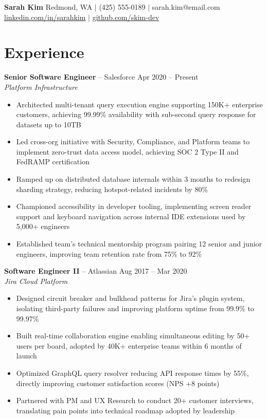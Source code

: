 \documentclass[10pt,letterpaper]{article}
\begin{document}
{\large\bfseries Sarah Kim} \hfill {\footnotesize Redmond, WA $\mid$ (425) 555-0189 $\mid$ sarah.kim@email.com}\\
{\footnotesize \href{https://linkedin.com/in/sarahkim}{linkedin.com/in/sarahkim} $\mid$ \href{https://github.com/skim-dev}{github.com/skim-dev}}

\section{Experience}

{\bfseries Senior Software Engineer} -- Salesforce \hfill {\footnotesize\color{accent} Apr 2020 -- Present}\\[-2pt]
{\footnotesize\itshape Platform Infrastructure}
\begin{itemize}
    \item Architected multi-tenant query execution engine supporting 150K+ enterprise customers, achieving 99.99\% availability with sub-second query response for datasets up to 10TB
    \item Led cross-org initiative with Security, Compliance, and Platform teams to implement zero-trust data access model, achieving SOC 2 Type II and FedRAMP certification
    \item Ramped up on distributed database internals within 3 months to redesign sharding strategy, reducing hotspot-related incidents by 80\%
    \item Championed accessibility in developer tooling, implementing screen reader support and keyboard navigation across internal IDE extensions used by 5,000+ engineers
    \item Established team's technical mentorship program pairing 12 senior and junior engineers, improving team retention rate from 75\% to 92\%
\end{itemize}

{\bfseries Software Engineer II} -- Atlassian \hfill {\footnotesize\color{accent} Aug 2017 -- Mar 2020}\\[-2pt]
{\footnotesize\itshape Jira Cloud Platform}
\begin{itemize}
    \item Designed circuit breaker and bulkhead patterns for Jira's plugin system, isolating third-party failures and improving platform uptime from 99.9\% to 99.97\%
    \item Built real-time collaboration engine enabling simultaneous editing by 50+ users per board, adopted by 40K+ enterprise teams within 6 months of launch
    \item Optimized GraphQL query resolver reducing API response times by 55\%, directly improving customer satisfaction scores (NPS +8 points)
    \item Partnered with PM and UX Research to conduct 20+ customer interviews, translating pain points into technical roadmap adopted by leadership
\end{itemize}
\end{document}
